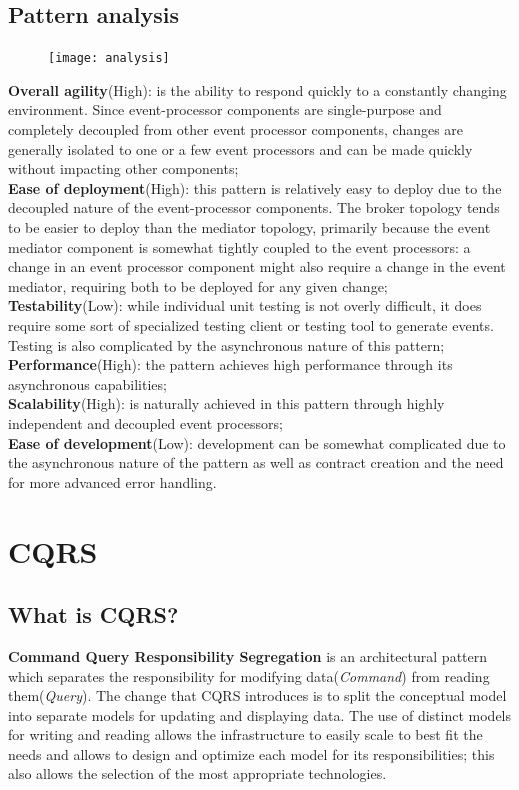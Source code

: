 \documentclass[11pt]{article} %
\begin{document}
\subsection{Pattern analysis}
\begin{figure} [H]
	\centering
	\texttt{[image: analysis]}
\end{figure}
 \textbf{Overall agility}(\color{darkgreen}High\color{black}): is the ability to respond quickly to a constantly changing environment. Since event-processor components are single-purpose and completely decoupled from other event processor components, changes are generally isolated to one or a few event processors and can be made quickly without impacting other components; \\
 \textbf{Ease of deployment}(\color{darkgreen}High\color{black}): this pattern is relatively easy to deploy due to the decoupled nature of the event-processor components. The broker topology tends to be easier to deploy than the mediator topology, primarily because the event mediator component is somewhat tightly coupled to the event processors: a change in an event processor component might also require a change in the event mediator, requiring both to be deployed for any given change; \\
 \textbf{Testability}(\color{red}Low\color{black}): while individual unit testing is not overly difficult, it does require some sort of specialized testing client or testing tool to generate events. Testing is also complicated by the asynchronous nature of this pattern; \\
 \textbf{Performance}(\color{darkgreen}High\color{black}): the pattern achieves high performance through its asynchronous capabilities; \\
 \textbf{Scalability}(\color{darkgreen}High\color{black}): is naturally achieved in this pattern through highly independent and decoupled event processors; \\
 \textbf{Ease of development}(\color{red}Low\color{black}): development can be somewhat complicated due to the asynchronous nature of the pattern as well as contract creation and the need for more advanced error handling.

\newpage
\section{CQRS} 
\subsection{What is CQRS?}
\textbf{Command Query Responsibility Segregation} is an architectural pattern which separates the responsibility for modifying data(\emph{Command}) from reading them(\emph{Query}). The change that CQRS introduces is to split the conceptual model into separate models for updating and displaying data. The use of distinct models for writing and reading allows the infrastructure to easily scale to best fit the needs and allows to design and optimize each model for its responsibilities; this also allows the selection of the most appropriate technologies.
\end{document}
